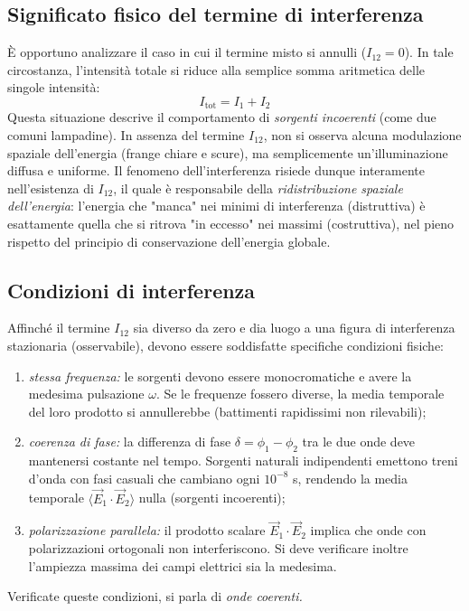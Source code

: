\documentclass[a4paper,11pt]{report}
\begin{document}
\subsection{Significato fisico del termine di interferenza}
È opportuno analizzare il caso in cui il termine misto si annulli ($I_{12} = 0$). In tale circostanza, l'intensità totale si riduce alla semplice somma aritmetica delle singole intensità:
\begin{equation}
    I_{\text{tot}} = I_1 + I_2
\end{equation}
Questa situazione descrive il comportamento di \textit{sorgenti incoerenti} (come due comuni lampadine). In assenza del termine $I_{12}$, non si osserva alcuna modulazione spaziale dell'energia (frange chiare e scure), ma semplicemente un'illuminazione diffusa e uniforme.
Il fenomeno dell'interferenza risiede dunque interamente nell'esistenza di $I_{12}$, il quale è responsabile della \textit{ridistribuzione spaziale dell'energia}: l'energia che "manca" nei minimi di interferenza (distruttiva) è esattamente quella che si ritrova "in eccesso" nei massimi (costruttiva), nel pieno rispetto del principio di conservazione dell'energia globale.

\subsection{Condizioni di interferenza}
Affinché il termine $I_{12}$ sia diverso da zero e dia luogo a una figura di interferenza stazionaria (osservabile), devono essere soddisfatte specifiche condizioni fisiche:
\begin{enumerate}
    \item \textit{stessa frequenza:} le sorgenti devono essere monocromatiche e avere la medesima pulsazione $\omega$. Se le frequenze fossero diverse, la media temporale del loro prodotto si annullerebbe (battimenti rapidissimi non rilevabili);
    \item \textit{coerenza di fase:} la differenza di fase $\delta = \phi_1 - \phi_2$ tra le due onde deve mantenersi costante nel tempo. Sorgenti naturali indipendenti emettono treni d'onda con fasi casuali che cambiano ogni $10^{-8}$ s, rendendo la media temporale $\langle \vec{E}_1 \cdot \vec{E}_2 \rangle$ nulla (sorgenti incoerenti);
    \item \textit{polarizzazione parallela:} il prodotto scalare $\vec{E}_1 \cdot \vec{E}_2$ implica che onde con polarizzazioni ortogonali non interferiscono. Si deve verificare inoltre l'ampiezza massima dei campi elettrici sia la medesima.
\end{enumerate}
Verificate queste condizioni, si parla di \textit{onde coerenti.}
\end{document}
